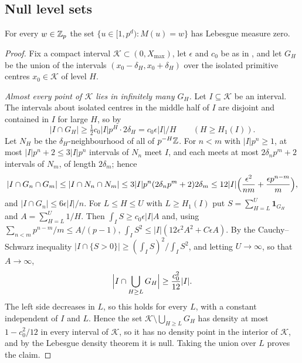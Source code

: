 \documentclass[11pt]{article}
\begin{document}
\subsection{Null level sets}\label{sec:quad-null}

\begin{proposition}\label{prop:nulllevel}
For every $w\in\mathbb Z_p$ the set $\{u\in[1,p^d):M(u)=w\}$ has Lebesgue measure zero.
\end{proposition}

\begin{proof}
Fix a compact interval $\mathcal K\subset(0,X_{\max})$, let $\epsilon$ and $c_0$ be as in
, and let $G_H$ be the union of the intervals $(x_0-\delta_H,x_0+\delta_H)$ over the
isolated primitive centres $x_0\in\mathcal K$ of level $H$.

\emph{Almost every point of $\mathcal K$ lies in infinitely many $G_H$.} Let $I\subseteq\mathcal K$ be an
interval. The intervals about isolated centres in the middle half of $I$ are disjoint and contained in
$I$ for large $H$, so by 
\[
|I\cap G_H|\ge\tfrac12c_0|I|p^H\cdot2\delta_H=c_0\epsilon|I|/H\qquad(H\ge H_1(I)).
\]
Let $N_H$ be the $\delta_H$-neighbourhood of all of $p^{-H}\mathbb Z$. For $n<m$ with $|I|p^n\ge1$, at most
$|I|p^n+2\le3|I|p^n$ intervals of $N_n$ meet $I$, and each meets at most $2\delta_np^m+2$ intervals of
$N_m$, of length $2\delta_m$; hence
\[
|I\cap G_n\cap G_m|\le|I\cap N_n\cap N_m|\le3|I|p^n(2\delta_np^m+2)2\delta_m
\le12|I|\Bigl(\frac{\epsilon^2}{nm}+\frac{\epsilon p^{n-m}}m\Bigr),
\]
and $|I\cap G_n|\le6\epsilon|I|/n$. For $L\le H\le U$ with $L\ge H_1(I)$ put $S=\sum_{H=L}^U\mathbf1_{G_H}$
and $A=\sum_{H=L}^U1/H$. Then $\int_IS\ge c_0\epsilon|I|A$ and, using $\sum_{n<m}p^{n-m}/m\le A/(p-1)$,
$\int_IS^2\le|I|(12\epsilon^2A^2+C\epsilon A)$. By the Cauchy--Schwarz inequality
$|I\cap\{S>0\}|\ge(\int_IS)^2/\int_IS^2$, and letting $U\to\infty$, so that $A\to\infty$,
\[
\Bigl|I\cap\bigcup_{H\ge L}G_H\Bigr|\ge\frac{c_0^2}{12}|I| .
\]
The left side decreases in $L$, so this holds for every $L$, with a constant independent of $I$ and $L$.
Hence the set $\mathcal K\setminus\bigcup_{H\ge L}G_H$ has density at most $1-c_0^2/12$ in every interval
of $\mathcal K$, so it has no density point in the interior of $\mathcal K$, and by the Lebesgue density
theorem it is null. Taking the union over $L$ proves the claim.


\end{proof}
\end{document}

